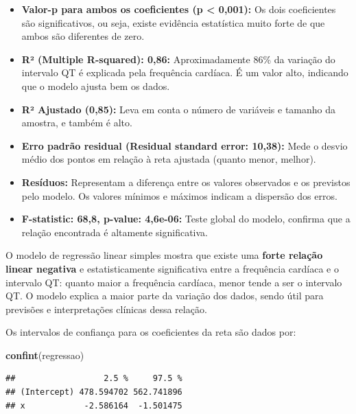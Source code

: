 \documentclass[
]{book}
\newenvironment{Shaded}{\begin{snugshade}}{\end{snugshade}}
\newcommand{\FunctionTok}[1]{\textcolor[rgb]{0.13,0.29,0.53}{\textbf{#1}}}
\newcommand{\NormalTok}[1]{#1}
\begin{document}
\begin{itemize}
\item
  \textbf{Valor-p para ambos os coeficientes (p \textless{} 0,001):} Os dois coeficientes são significativos, ou seja, existe evidência estatística muito forte de que ambos são diferentes de zero.
\item
  \textbf{R² (Multiple R-squared): 0,86:} Aproximadamente 86\% da variação do intervalo QT é explicada pela frequência cardíaca. É um valor alto, indicando que o modelo ajusta bem os dados.
\item
  \textbf{R² Ajustado (0,85):} Leva em conta o número de variáveis e tamanho da amostra, e também é alto.
\item
  \textbf{Erro padrão residual (Residual standard error: 10,38):} Mede o desvio médio dos pontos em relação à reta ajustada (quanto menor, melhor).
\item
  \textbf{Resíduos:} Representam a diferença entre os valores observados e os previstos pelo modelo. Os valores mínimos e máximos indicam a dispersão dos erros.
\item
  \textbf{F-statistic: 68,8, p-value: 4,6e-06:} Teste global do modelo, confirma que a relação encontrada é altamente significativa.
\end{itemize}

O modelo de regressão linear simples mostra que existe uma \textbf{forte relação linear negativa} e estatisticamente significativa entre a frequência cardíaca e o intervalo QT: quanto maior a frequência cardíaca, menor tende a ser o intervalo QT. O modelo explica a maior parte da variação dos dados, sendo útil para previsões e interpretações clínicas dessa relação.

Os intervalos de confiança para os coeficientes da reta são dados por:

\begin{Shaded}
\begin{Highlighting}[]
\FunctionTok{confint}\NormalTok{(regressao)}
\end{Highlighting}
\end{Shaded}

\begin{verbatim}
##                  2.5 %     97.5 %
## (Intercept) 478.594702 562.741896
## x            -2.586164  -1.501475
\end{verbatim}
\end{document}
